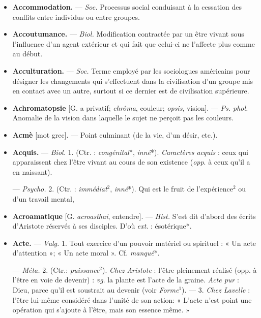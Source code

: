 \begin{itemize}[leftmargin=1cm, label=, itemsep=1pt]
\item {\bf Accommodation.} — \textsf{\textit {Soc.}} Processus
social conduisant à la cessation des
conflits entre individus ou entre
groupes.

\item {\bf Accoutumance.} — \textsf{\textit {Biol.}} Modification
contractée par un être vivant sous
l'influence d’un agent extérieur et
qui fait que celui-ci ne l’affecte plus
comme au début.

\item {\bf Acculturation.} — \textsf{\textit {Soc.}} Terme employé
par les sociologues américains pour
désigner les changements qui s’effectuent dans la civilisation d’un groupe
mis en contact avec un autre, surtout si ce dernier est de civilisation
supérieure.

\item {\bf Achromatopsie} [G. a privatif; {\it chrôma},
couleur; {\it opsis}, vision]. — \textsf{\textit {Ps. phol.}}
Anomalie de la vision dans laquelle
le sujet ne perçoit pas les couleurs.

\item {\bf Acmè} [mot grec]. — Point culminant
(de la vie, d’un désir, etc.).

\item {\bf Acquis.} — \textsf{\textit {Biol.}} 1. (Ctr. : {\it congénital}*,
{\it inné}*). {\it Caractères acquis} : ceux qui
apparaissent chez l’être vivant au
cours de son existence ({\it opp}. à ceux
qu'il a en naissant).

— \textsf{\textit {Psycho.}} 2. (Ctr. : {\it immédiat}$^2$,
{\it inné}*). Qui est le fruit de l’expérience$^2$ ou d’un travail mental,

\item {\bf Acroamatique} [G. {\it acroasthai}, entendre]. — \textsf{\textit {Hist.}} S’est dit d’abord des
écrits d’Aristote réservés à ses disciples. D’où {\it ext}. : ésotérique*.

\item {\bf Acte.} — \textsf{\textit {Vulg.}} 1. Tout exercice d’un
pouvoir matériel ou spirituel : « Un
acte d'attention »; « Un acte moral ».
Cf. {\it manqué}*.

— \textsf{\textit {Méta.}} 2. (Ctr.: {\it puissance}$^2$). {\it Chez
Aristote} : l'être pleinement réalisé
(opp. à l'être en voie de devenir) :
{\it vg}. la plante est l'acte de la graine.
{\it Acte pur} : Dieu, parce qu’il est soustrait au devenir (voir {\it Forme}$^1$). —
3. {\it Chez Lavelle} : l'être lui-même
considéré dans l’unité de son action:
« L'acte n’est point une opération
qui s'ajoute à l'être, mais son
essence même. »


\end{itemize}
